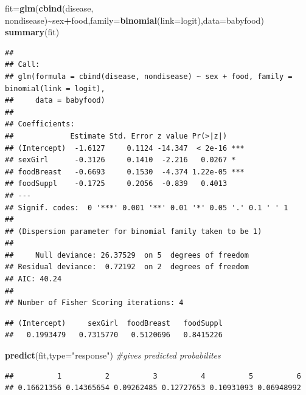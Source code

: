 \documentclass[
  ignorenonframetext,
]{beamer}
\newenvironment{Shaded}{\begin{snugshade}}{\end{snugshade}}
\newcommand{\AttributeTok}[1]{\textcolor[rgb]{0.13,0.29,0.53}{#1}}
\newcommand{\CommentTok}[1]{\textcolor[rgb]{0.56,0.35,0.01}{\textit{#1}}}
\newcommand{\FunctionTok}[1]{\textcolor[rgb]{0.13,0.29,0.53}{\textbf{#1}}}
\newcommand{\NormalTok}[1]{#1}
\newcommand{\OtherTok}[1]{\textcolor[rgb]{0.56,0.35,0.01}{#1}}
\newcommand{\SpecialCharTok}[1]{\textcolor[rgb]{0.81,0.36,0.00}{\textbf{#1}}}
\newcommand{\StringTok}[1]{\textcolor[rgb]{0.31,0.60,0.02}{#1}}
\begin{document}
\begin{frame}[fragile]
\footnotesize

\begin{Shaded}
\begin{Highlighting}[]
\NormalTok{fit}\OtherTok{=}\FunctionTok{glm}\NormalTok{(}\FunctionTok{cbind}\NormalTok{(disease, nondisease)}\SpecialCharTok{\textasciitilde{}}\NormalTok{sex}\SpecialCharTok{+}\NormalTok{food,}\AttributeTok{family=}\FunctionTok{binomial}\NormalTok{(}\AttributeTok{link=}\NormalTok{logit),}\AttributeTok{data=}\NormalTok{babyfood)}
\FunctionTok{summary}\NormalTok{(fit)}
\end{Highlighting}
\end{Shaded}

\begin{verbatim}
## 
## Call:
## glm(formula = cbind(disease, nondisease) ~ sex + food, family = binomial(link = logit), 
##     data = babyfood)
## 
## Coefficients:
##             Estimate Std. Error z value Pr(>|z|)    
## (Intercept)  -1.6127     0.1124 -14.347  < 2e-16 ***
## sexGirl      -0.3126     0.1410  -2.216   0.0267 *  
## foodBreast   -0.6693     0.1530  -4.374 1.22e-05 ***
## foodSuppl    -0.1725     0.2056  -0.839   0.4013    
## ---
## Signif. codes:  0 '***' 0.001 '**' 0.01 '*' 0.05 '.' 0.1 ' ' 1
## 
## (Dispersion parameter for binomial family taken to be 1)
## 
##     Null deviance: 26.37529  on 5  degrees of freedom
## Residual deviance:  0.72192  on 2  degrees of freedom
## AIC: 40.24
## 
## Number of Fisher Scoring iterations: 4
\end{verbatim}

\begin{Shaded}
\end{Shaded}

\begin{verbatim}
## (Intercept)     sexGirl  foodBreast   foodSuppl 
##   0.1993479   0.7315770   0.5120696   0.8415226
\end{verbatim}

\begin{Shaded}
\begin{Highlighting}[]
\FunctionTok{predict}\NormalTok{(fit,}\AttributeTok{type=}\StringTok{"response"}\NormalTok{) }\CommentTok{\#gives predicted probabilites}
\end{Highlighting}
\end{Shaded}

\begin{verbatim}
##          1          2          3          4          5          6 
## 0.16621356 0.14365654 0.09262485 0.12727653 0.10931093 0.06948992
\end{verbatim}

\normalsize
\end{frame}
\end{document}
